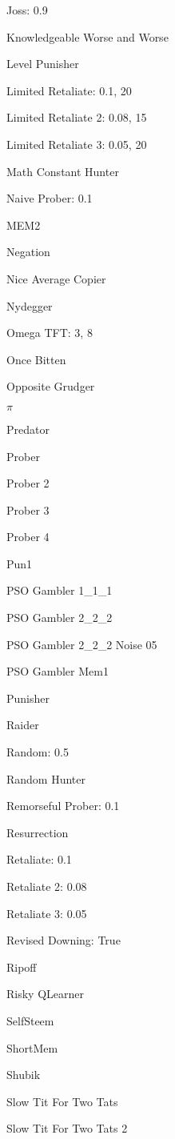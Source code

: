 \item Joss: 0.9
\item Knowledgeable Worse and Worse
\item Level Punisher
\item Limited Retaliate: 0.1, 20
\item Limited Retaliate 2: 0.08, 15
\item Limited Retaliate 3: 0.05, 20
\item Math Constant Hunter
\item Naive Prober: 0.1
\item MEM2
\item Negation
\item Nice Average Copier
\item Nydegger
\item Omega TFT: 3, 8
\item Once Bitten
\item Opposite Grudger
\item $\pi$
\item Predator
\item Prober
\item Prober 2
\item Prober 3
\item Prober 4
\item Pun1
\item PSO Gambler 1\_1\_1
\item PSO Gambler 2\_2\_2
\item PSO Gambler 2\_2\_2 Noise 05
\item PSO Gambler Mem1
\item Punisher
\item Raider
\item Random: 0.5
\item Random Hunter
\item Remorseful Prober: 0.1
\item Resurrection
\item Retaliate: 0.1
\item Retaliate 2: 0.08
\item Retaliate 3: 0.05
\item Revised Downing: True
\item Ripoff
\item Risky QLearner
\item SelfSteem
\item ShortMem
\item Shubik
\item Slow Tit For Two Tats
\item Slow Tit For Two Tats 2

